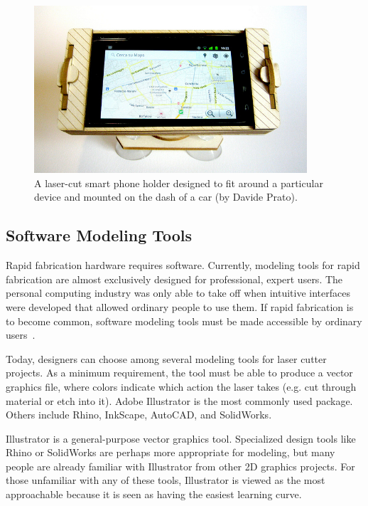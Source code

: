 \documentclass[12pt]{article}
\begin{document}
\begin{figure}[h] %
   \centering
   \includegraphics[width=4in]{img/phone-holder.jpg} 
   \caption{A laser-cut smart phone holder designed to fit around a
     particular device and mounted on the dash of a car (by Davide
     Prato).}
   \label{fig:phone-holder}
\end{figure}

\subsection{Software Modeling Tools}

Rapid fabrication hardware requires software. Currently, modeling
tools for rapid fabrication are almost exclusively designed for
professional, expert users. The personal computing industry was only
able to take off when intuitive interfaces were developed that allowed
ordinary people to use them. If rapid fabrication is to become common,
software modeling tools must be made accessible by ordinary
users~\cite{lipson-homefactory}.

Today, designers can choose among several modeling tools for laser
cutter projects. As a minimum requirement, the tool must be able to
produce a vector graphics file, where colors indicate which action the
laser takes (e.g. cut through material or etch into it). Adobe
Illustrator is the most commonly used package. Others include Rhino,
InkScape, AutoCAD, and SolidWorks.

Illustrator is a general-purpose vector graphics tool. Specialized
design tools like Rhino or SolidWorks are perhaps more appropriate for
modeling, but many people are already familiar with Illustrator from
other 2D graphics projects. For those unfamiliar with any of these
tools, Illustrator is viewed as the most approachable because it is
seen as having the easiest learning curve.
\end{document}
